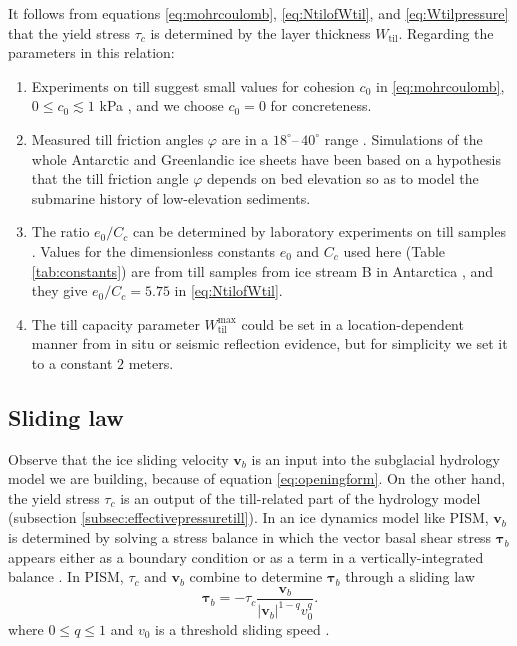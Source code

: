 \documentclass[gmd]{copernicus}   %
\begin{document}
It follows from equations \eqref{eq:mohrcoulomb}, \eqref{eq:NtilofWtil}, and \eqref{eq:Wtilpressure} that the yield stress $\tau_c$ is determined by the layer thickness $W_{\text{til}}$.  Regarding the parameters in this relation:
\renewcommand{\labelenumi}{(\emph{\roman{enumi}})}
\begin{enumerate}
\item Experiments on till suggest small values for cohesion $c_0$ in \eqref{eq:mohrcoulomb}, $0 \le c_0 \lesssim 1$ kPa \citep{Tulaczyketal2000}, and we choose $c_0=0$ for concreteness.
\item Measured till friction angles $\varphi$ are in a $18^\circ$--\,$40^\circ$ range \citep{CuffeyPaterson}.  Simulations of the whole Antarctic \citep{Martinetal2011} and Greenlandic \citep{AschwandenAdalgeirsdottirKhroulev} ice sheets have been based on a hypothesis that the till friction angle $\varphi$ depends on bed elevation so as to model the submarine history of low-elevation sediments.
\item The ratio $e_0/C_c$ can be determined by laboratory experiments on till samples \citep[e.g.][]{Hookeetal1997,Tulaczyketal2000}.  Values for the dimensionless constants $e_0$ and $C_c$ used here (Table \ref{tab:constants}) are from till samples from ice stream B in Antarctica \citep{Tulaczyketal2000}, and they give $e_0/C_c=5.75$ in \eqref{eq:NtilofWtil}.
\item The till capacity parameter $W_{\text{til}}^{\text{max}}$ could be set in a location-dependent manner from in situ \citep{Tulaczyketal2000} or seismic reflection \citep{Rooneyetal1987} evidence, but for simplicity we set it to a constant $2$ meters.
\end{enumerate}

\subsection{Sliding law}  Observe that the ice sliding velocity $\mathbf{v}_b$ is an input into the subglacial hydrology model we are building, because of equation \eqref{eq:openingform}.  On the other hand, the yield stress $\tau_c$ is an output of the till-related part of the hydrology model (subsection \ref{subsec:effectivepressuretill}).  In an ice dynamics model like PISM, $\mathbf{v}_b$ is determined by solving a stress balance in which the vector basal shear stress $\boldsymbol\tau_b$ appears either as a boundary condition \citep{SchoofCoulombBlatter} or as a term in a vertically-integrated balance \citep{SchoofStream,BBssasliding}.  In PISM, $\tau_c$ and $\mathbf{v}_b$ combine to determine $\boldsymbol\tau_b$ through a sliding law
\begin{equation}
\boldsymbol\tau_b = - \tau_c \frac{\mathbf{v}_b}{|\mathbf{v}_b|^{1-q} v_0^q}. \label{eq:pseudobasalstress}
\end{equation}
where $0\le q \le 1$ and $v_0$ is a threshold sliding speed \citep{AschwandenAdalgeirsdottirKhroulev}.
\end{document}
